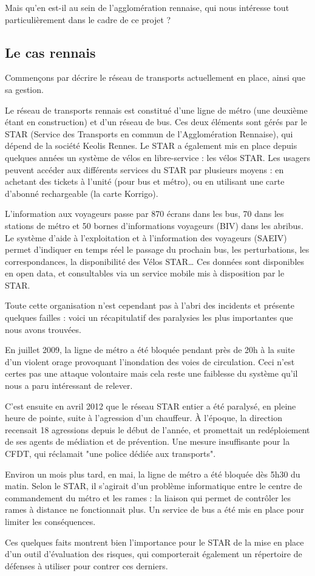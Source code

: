 	Mais qu'en est-il au sein de l'agglomération rennaise, qui nous intéresse tout particulièrement dans le cadre de ce projet ?
		
		\subsection{ Le cas rennais }
		
	 Commençons par décrire le réseau de transports actuellement en place, ainsi que sa gestion.

	Le réseau de transports rennais est constitué d'une ligne de métro (une deuxième étant en construction) et d'un réseau de bus. Ces deux éléments sont gérés par le STAR (Service des Transports en commun de l'Agglomération Rennaise), qui dépend de la société Keolis Rennes. Le STAR a également mis en place depuis quelques années un système de vélos en libre-service : les vélos STAR. Les usagers peuvent accéder aux différents services du STAR par plusieurs moyens : en achetant des tickets à l'unité (pour bus et métro), ou en utilisant une carte d'abonné rechargeable (la carte Korrigo). 
	
	L'information aux voyageurs passe par 870 écrans dans les bus, 70 dans les stations de métro et 50 bornes d’informations voyageurs (BIV) dans les abribus. Le système d’aide à l’exploitation et à l’information des voyageurs (SAEIV) permet d’indiquer en temps réel le passage du prochain bus, les perturbations, les correspondances, la disponibilité des Vélos STAR… Ces données sont disponibles en open data, et consultables via un service mobile mis à disposition par le STAR.

	Toute cette organisation n'est cependant pas à l'abri des incidents et présente quelques failles : voici un récapitulatif des paralysies les plus importantes que nous avons trouvées.

	En juillet 2009, la ligne de métro a été bloquée pendant près de 20h à la suite d'un violent orage provoquant l'inondation des voies de circulation. Ceci n'est certes pas une attaque volontaire mais cela reste une faiblesse du système qu'il nous a paru intéressant de relever. 

	C'est ensuite en avril 2012 que le réseau STAR entier a été paralysé, en pleine heure de pointe, suite à l'agression d'un chauffeur. À l'époque, la direction recensait 18 agressions depuis le début de l'année, et promettait un redéploiement de ses agents de médiation et de prévention. Une mesure insuffisante pour la CFDT, qui réclamait "une police dédiée aux transports".

	Environ un mois plus tard, en mai, la ligne de métro a été bloquée dès 5h30 du matin. Selon le STAR, il s’agirait d’un problème informatique entre le centre de commandement du métro et les rames : la liaison qui permet de contrôler les rames à distance ne fonctionnait plus. Un service de bus a été mis en place pour limiter les conséquences.

	Ces quelques faits montrent bien l'importance pour le STAR de la mise en place d'un outil d'évaluation des risques, qui comporterait également un répertoire de défenses à utiliser pour contrer ces derniers.
